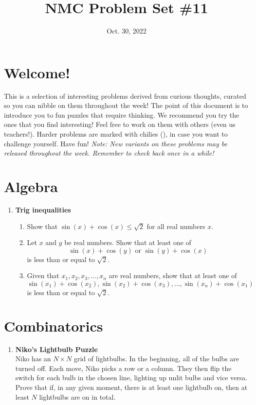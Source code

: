 \documentclass[11pt]{scrartcl}
\begin{document}
\title{NMC Problem Set \#11} %
\date{Oct. 30, 2022} %
\maketitle

\section*{Welcome!}

This is a selection of interesting problems derived from curious thoughts, curated so you can nibble on them throughout the week! The point of this document is to introduce you to fun puzzles that require thinking. We recommend you try the ones that you find interesting! Feel free to work on them with others (even us teachers!). Harder problems are marked with chilies (\fullchili), in case you want to challenge yourself.
\newline\newline
Have fun! \textit{Note: New variants on these problems may be released throughout the week. Remember to check back once in a while!}
    
\section{Algebra}
\begin{enumerate}[label=\textbf{A\arabic*}.]
    \item \textbf{Trig inequalities}
    \begin{enumerate}
        \item Show that $\sin(x) + \cos(x) \le \sqrt{2}$ for all real numbers $x$.
        
        \item Let $x$ and $y$ be real numbers. Show that at least one of 
        \[ \sin(x) + \cos(y) \text{ or } \sin(y) + \cos(x) \]
        is less than or equal to $\sqrt{2}$.
        
        \item Given that $x_1, x_2, x_3, ..., x_n$ are real numbers, show that at least one of 
        \[ \sin(x_1) + \cos(x_2), \sin(x_2) + \cos(x_3), \dots, \sin(x_n) + \cos(x_1) \]
        is less than or equal to $\sqrt{2}$.
    \end{enumerate}
\end{enumerate}

\newpage
\section{Combinatorics}
\begin{enumerate}[label=\textbf{C\arabic*}.]
    \item \textbf{Niko's Lightbulb Puzzle}\\
    Niko has an $N \times N$ grid of lightbulbs. In the beginning, all of the bulbs are turned off. Each move, Niko picks a row or a column. They then flip the switch for each bulb in the chosen line, lighting up unlit bulbs and vice versa. Prove that if, in any given moment, there is at least one lightbulb on, then at least $N$ lightbulbs are on in total.
\end{enumerate}
\end{document}
